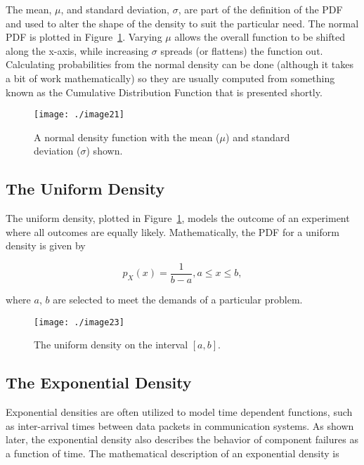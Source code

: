 The mean, $\mu$, and standard deviation, $\sigma$, are part of the
definition of the PDF and used to alter the shape of the density to suit
the particular need. The normal PDF is plotted in 
Figure~\ref{figure:normalDensityFunction}. Varying
$\mu$ allows the overall function to be shifted along the x-axis,
while increasing $\sigma$ spreads (or flattens) the function out.
Calculating probabilities from the normal density can be done (although
it takes a bit of work mathematically) so they are usually computed from
something known as the Cumulative Distribution Function that is
presented shortly.

\begin{figure}
\texttt{[image: ./image21]}
\caption{A normal density function with the mean ($\mu$)
and standard deviation ($\sigma$) shown.}
\label{figure:normalDensityFunction}
\end{figure}


\subsection*{The Uniform Density}
\label{subsection:the-uniform-density}


The uniform density, plotted in 
Figure~\ref{figure:normalDensityFunction}, models the outcome of an
experiment where all outcomes are equally likely. Mathematically, the
PDF for a uniform density is given by

\begin{equation}
\label{equ:uniformDensity}
p_X(x) = \frac{1}{b-a}, a \leq x \leq b,
\end{equation}

where $a$, $b$ are selected to meet the demands of a particular problem.


\begin{figure}
\texttt{[image: ./image23]}
\caption{The uniform density on the interval $[ a,b ]$.}
\label{figure:uniformDensityFunction}
\end{figure}


\subsection*{The Exponential Density}
\label{subsection:the-exponential-density}


Exponential densities are often utilized to model time dependent
functions, such as inter-arrival times between data packets in
communication systems. As shown later, the exponential density also
describes the behavior of component failures as a function of time. The
mathematical description of an exponential density is

